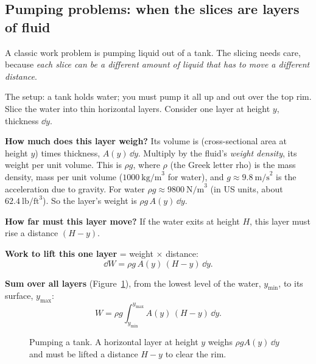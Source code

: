 \subsection{Pumping problems: when the slices are layers of fluid}

A classic work problem is pumping liquid out of a tank. The slicing needs care,
because \emph{each slice can be a different amount of liquid that has to move a
different distance}.

The setup: a tank holds water; you must pump it all up and out over the top rim.
Slice the water into thin horizontal layers. Consider one layer at height $y$,
thickness $\dd y$.

\textbf{How much does this layer weigh?} Its volume is (cross-sectional area at
height $y$) times thickness, $A(y)\,\dd y$. Multiply by the fluid's \emph{weight
density}, its weight per unit volume. This is $\rho g$, where $\rho$ (the Greek
letter rho) is the mass density, mass per unit volume ($1000\ \text{kg/m}^3$ for
water), and $g \approx 9.8\ \text{m/s}^2$ is the acceleration due to gravity. For
water $\rho g \approx 9800\ \text{N/m}^3$ (in US units, about
$62.4\ \text{lb/ft}^3$). So the layer's weight is $\rho g\, A(y)\,\dd y$.

\textbf{How far must this layer move?} If the water exits at height $H$, this layer
must rise a distance $(H - y)$.

\textbf{Work to lift this one layer} = weight $\times$ distance:
\[
  \dd W = \rho g\, A(y)\,(H-y)\,\dd y.
\]

\textbf{Sum over all layers} (Figure~\ref{ch26:fig-pump}), from the lowest level
of the water, $y_{\min}$, to its surface, $y_{\max}$:
\[
  \boxed{\,W = \rho g\int_{y_{\min}}^{y_{\max}} A(y)\,(H-y)\,\dd y.\,}
\]

\begin{figure}[H]
\centering
{}
\caption{Pumping a tank. A horizontal layer at height $y$ weighs $\rho g A(y)\,\dd
y$ and must be lifted a distance $H-y$ to clear the rim.}
\label{ch26:fig-pump}
\end{figure}


